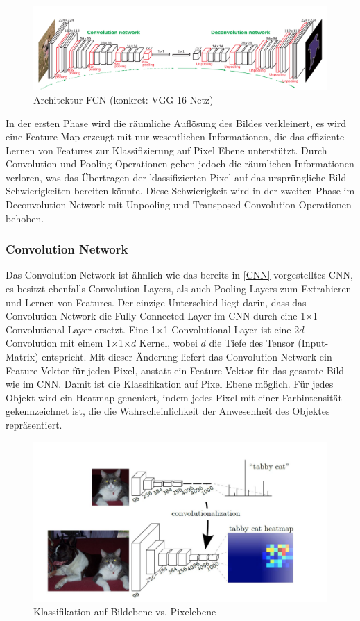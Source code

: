 \begin{figure}[H]
\centering
\includegraphics[width=\textwidth]{pic/Segmentierung/ArchitekturFCN.png}
\caption{\label{pic:fcn} Architektur FCN (konkret: VGG-16 Netz)}
\end{figure}

In der ersten Phase wird die räumliche Auflösung des Bildes verkleinert, es wird eine Feature Map erzeugt mit nur wesentlichen Informationen, die das effiziente Lernen von Features zur Klassifizierung auf Pixel Ebene unterstützt. Durch Convolution und Pooling Operationen gehen jedoch die räumlichen Informationen verloren, was das Übertragen der klassifizierten Pixel auf das ursprüngliche Bild Schwierigkeiten bereiten könnte. Diese Schwierigkeit wird in der zweiten Phase im Deconvolution Network mit Unpooling und Transposed Convolution Operationen behoben.


\subsubsection{Convolution Network}
Das Convolution Network ist ähnlich wie das bereits in \ref{CNN} vorgestelltes CNN, es besitzt ebenfalls Convolution Layers, als auch Pooling Layers zum Extrahieren und Lernen von Features. Der einzige Unterschied liegt darin, dass das Convolution Network die Fully Connected Layer im CNN durch eine 1$\times$1 Convolutional Layer ersetzt.  Eine 1$\times$1 Convolutional Layer ist eine 2$d$-Convolution mit einem 1$\times$1$\times$$d$ Kernel, wobei $d$ die Tiefe des Tensor (Input-Matrix) entspricht. Mit dieser Änderung liefert das Convolution Network ein Feature Vektor für jeden Pixel, anstatt ein Feature Vektor für das gesamte Bild wie im CNN. Damit ist die Klassifikation auf Pixel Ebene möglich. Für jedes Objekt wird ein Heatmap geneniert, indem jedes Pixel mit einer Farbintensität gekennzeichnet ist, die die Wahrscheinlichkeit der Anwesenheit des Objektes repräsentiert.


\begin{figure}[H]
\centering
\includegraphics[width=0.8\linewidth]{pic/Segmentierung/Klassifikation_Pixelebene.png}
\caption{\label{pic:class_per_pixel} Klassifikation auf Bildebene vs. Pixelebene}
\end{figure}

